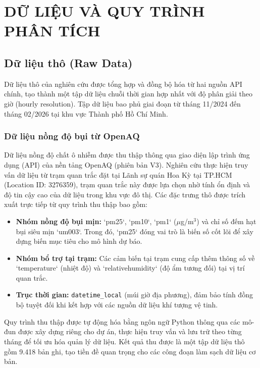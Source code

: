 \chapter{DỮ LIỆU VÀ QUY TRÌNH PHÂN TÍCH}
\section{Dữ liệu thô (Raw Data)}
Dữ liệu thô của nghiên cứu được tổng hợp và đồng bộ hóa từ hai nguồn API chính, tạo thành một tập dữ liệu chuỗi thời gian hợp nhất với độ phân giải theo giờ (hourly resolution). Tập dữ liệu bao phủ giai đoạn từ tháng 11/2024 đến tháng 02/2026 tại khu vực Thành phố Hồ Chí Minh.
\subsection{Dữ liệu nồng độ bụi từ OpenAQ}
Dữ liệu nồng độ chất ô nhiễm được thu thập thông qua giao diện lập trình ứng dụng (API) của nền tảng OpenAQ (phiên bản V3). Nghiên cứu thực hiện truy vấn dữ liệu từ trạm quan trắc đặt tại Lãnh sự quán Hoa Kỳ tại TP.HCM (Location ID: 3276359), trạm quan trắc này được lựa chọn nhờ tính ổn định và độ tin cậy cao của dữ liệu trong khu vực đô thị.
Các đặc trưng thô được trích xuất trực tiếp từ quy trình thu thập bao gồm:
\begin{itemize}
    \item \textbf{Nhóm nồng độ bụi mịn:} `pm25`, `pm10`, `pm1` ($\mu$g/m$^3$) và chỉ số đếm hạt bụi siêu mịn `um003`. Trong đó, `pm25` đóng vai trò là biến số cốt lõi để xây dựng biến mục tiêu cho mô hình dự báo.
    \item \textbf{Nhóm bổ trợ tại trạm:} Các cảm biến tại trạm cung cấp thêm thông số về `temperature` (nhiệt độ) và `relativehumidity` (độ ẩm tương đối) tại vị trí quan trắc.
    \item \textbf{Trục thời gian:} \texttt{datetime\_local} (múi giờ địa phương), đảm bảo tính đồng bộ tuyệt đối khi kết hợp với các nguồn dữ liệu khí tượng vệ tinh.
\end{itemize}
Quy trình thu thập được tự động hóa bằng ngôn ngữ Python thông qua các mô-đun được xây dựng riêng cho dự án, thực hiện truy vấn và lưu trữ theo từng tháng để tối ưu hóa quản lý dữ liệu. Kết quả thu được là một tập dữ liệu thô gồm 9.418 bản ghi, tạo tiền đề quan trọng cho các công đoạn làm sạch dữ liệu cơ bản.
